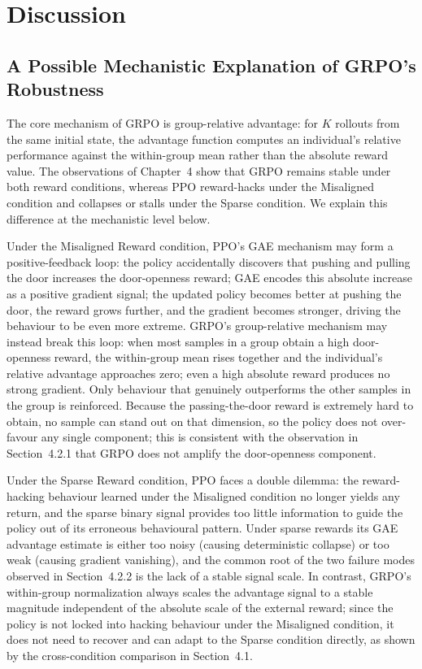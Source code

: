 \chapter{Discussion} \label{Chap5}

\section{A Possible Mechanistic Explanation of GRPO's Robustness}

The core mechanism of GRPO is group-relative advantage: for $K$ rollouts from the same initial state, the advantage function computes an individual's relative performance against the within-group mean rather than the absolute reward value. The observations of Chapter~4 show that GRPO remains stable under both reward conditions, whereas PPO reward-hacks under the Misaligned condition and collapses or stalls under the Sparse condition. We explain this difference at the mechanistic level below.

Under the Misaligned Reward condition, PPO's GAE mechanism may form a positive-feedback loop: the policy accidentally discovers that pushing and pulling the door increases the door-openness reward; GAE encodes this absolute increase as a positive gradient signal; the updated policy becomes better at pushing the door, the reward grows further, and the gradient becomes stronger, driving the behaviour to be even more extreme. GRPO's group-relative mechanism may instead break this loop: when most samples in a group obtain a high door-openness reward, the within-group mean rises together and the individual's relative advantage approaches zero; even a high absolute reward produces no strong gradient. Only behaviour that genuinely outperforms the other samples in the group is reinforced. Because the passing-the-door reward is extremely hard to obtain, no sample can stand out on that dimension, so the policy does not over-favour any single component; this is consistent with the observation in Section~4.2.1 that GRPO does not amplify the door-openness component.

Under the Sparse Reward condition, PPO faces a double dilemma: the reward-hacking behaviour learned under the Misaligned condition no longer yields any return, and the sparse binary signal provides too little information to guide the policy out of its erroneous behavioural pattern. Under sparse rewards its GAE advantage estimate is either too noisy (causing deterministic collapse) or too weak (causing gradient vanishing), and the common root of the two failure modes observed in Section~4.2.2 is the lack of a stable signal scale. In contrast, GRPO's within-group normalization always scales the advantage signal to a stable magnitude independent of the absolute scale of the external reward; since the policy is not locked into hacking behaviour under the Misaligned condition, it does not need to recover and can adapt to the Sparse condition directly, as shown by the cross-condition comparison in Section~4.1.

